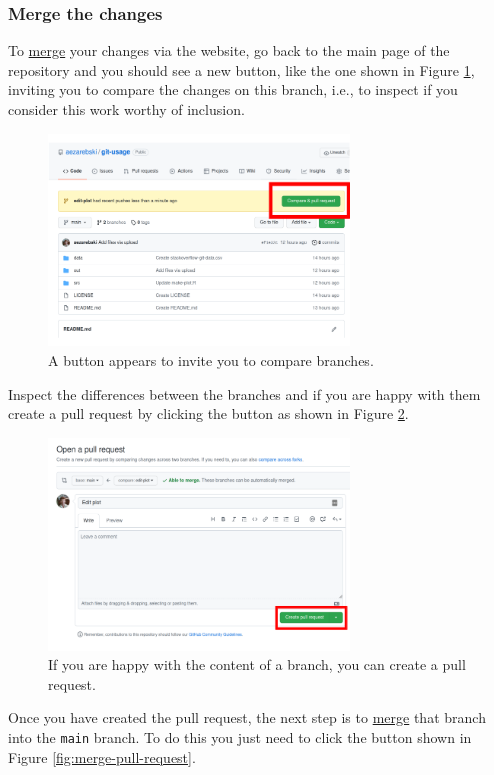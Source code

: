 \documentclass[11pt,onecolumn]{scrartcl}
\begin{document}
\subsubsection*{Merge the changes}
\label{sec:org8be90be}

To \hyperref[sec:orgce0d2b8]{merge} your changes via the website, go back to the main page of the
repository and you should see a new button, like the one shown in Figure
\ref{fig:pull-request}, inviting you to compare the changes on this branch, i.e., to
inspect if you consider this work worthy of inclusion.

\begin{figure}[htbp]
\centering
\includegraphics[width=8cm]{./pull-request.png}
\caption{\label{fig:pull-request}A button appears to invite you to compare branches.}
\end{figure}

Inspect the differences between the branches and if you are happy with them
create a pull request by clicking the button as shown in Figure
\ref{fig:create-pull-request}.

\begin{figure}[htbp]
\centering
\includegraphics[width=8cm]{./create-pull-request.png}
\caption{\label{fig:create-pull-request}If you are happy with the content of a branch, you can create a pull request.}
\end{figure}

Once you have created the pull request, the next step is to \hyperref[sec:orgce0d2b8]{merge} that branch
into the \texttt{main} branch. To do this you just need to click the button shown in
Figure \ref{fig:merge-pull-request}.
\end{document}
